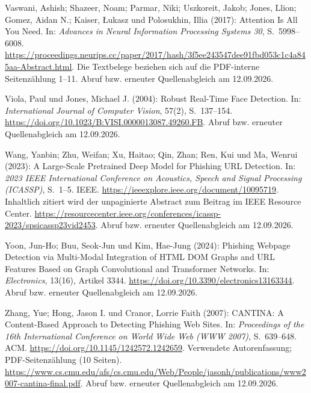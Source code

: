 \par\smallskip
\begin{samepage}
\noindent
Vaswani, Ashish; Shazeer, Noam; Parmar, Niki; Uszkoreit, Jakob;
Jones, Llion; Gomez, Aidan N.; Kaiser, Łukasz und Polosukhin, Illia (2017):
Attention Is All You Need.
In: \textit{Advances in Neural Information Processing Systems 30},
S.~5998--6008.
\url{https://proceedings.neurips.cc/paper/2017/hash/3f5ee243547dee91fbd053c1c4a845aa-Abstract.html}.
Die Textbelege beziehen sich auf die PDF-interne Seitenzählung 1--11.
Abruf bzw. erneuter Quellenabgleich am 12.09.2026.
\par\end{samepage}
\par\smallskip
\begin{samepage}
\noindent
Viola, Paul und Jones, Michael J. (2004):
Robust Real-Time Face Detection.
In: \textit{International Journal of Computer Vision},
57(2), S.~137--154.
\url{https://doi.org/10.1023/B:VISI.0000013087.49260.FB}.
Abruf bzw. erneuter Quellenabgleich am 12.09.2026.
\par\end{samepage}
\par\smallskip
\begin{samepage}
\noindent
Wang, Yanbin; Zhu, Weifan; Xu, Haitao; Qin, Zhan; Ren, Kui und Ma, Wenrui (2023):
A Large-Scale Pretrained Deep Model for Phishing URL Detection.
In: \textit{2023 IEEE International Conference on Acoustics, Speech and Signal Processing
(ICASSP)}, S.~1--5.
IEEE.
\url{https://ieeexplore.ieee.org/document/10095719}.
Inhaltlich zitiert wird der unpaginierte Abstract zum Beitrag im IEEE Resource Center. \url{https://resourcecenter.ieee.org/conferences/icassp-2023/spsicassp23vid2453}.
Abruf bzw. erneuter Quellenabgleich am 12.09.2026.
\par\end{samepage}
\par\smallskip
\begin{samepage}
\noindent
Yoon, Jun-Ho; Buu, Seok-Jun und Kim, Hae-Jung (2024):
Phishing Webpage Detection via Multi-Modal Integration of HTML DOM Graphs
and URL Features Based on Graph Convolutional and Transformer Networks.
In: \textit{Electronics}, 13(16), Artikel 3344.
\url{https://doi.org/10.3390/electronics13163344}.
Abruf bzw. erneuter Quellenabgleich am 12.09.2026.
\par\end{samepage}
\par\smallskip
\begin{samepage}
\noindent
Zhang, Yue; Hong, Jason I. und Cranor, Lorrie Faith (2007):
CANTINA: A Content-Based Approach to Detecting Phishing Web Sites.
In: \textit{Proceedings of the 16th International Conference on World Wide Web (WWW 2007)},
S.~639--648.
ACM.
\url{https://doi.org/10.1145/1242572.1242659}.
Verwendete Autorenfassung; PDF-Seitenzählung (10 Seiten). \url{https://www.cs.cmu.edu/afs/cs.cmu.edu/Web/People/jasonh/publications/www2007-cantina-final.pdf}.
Abruf bzw. erneuter Quellenabgleich am 12.09.2026.
\par\end{samepage}
